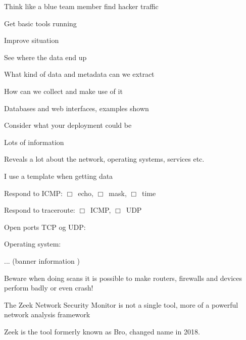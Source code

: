 \documentclass[Screen16to9,17pt]{foils}
\begin{document}
\begin{list1}
\item Think like a blue team member find hacker traffic
\item Get basic tools running
\item Improve situation
\begin{list2}
\item See where the data end up
\item What kind of data and metadata can we extract
\item How can we collect and make use of it
\item Databases and web interfaces, examples shown
\item Consider what your deployment could be
\end{list2}
\end{list1}





\begin{list1}
\item Lots of information
\item Reveals a lot about the network, operating systems, services etc.
\item I use a template when getting data
  \begin{list2}
    \item Respond to ICMP: $\Box$\  echo, $\Box$\ mask, $\Box$\ time
\item Respond to traceroute: $\Box$\ ICMP, $\Box$\ UDP
\item Open ports TCP og UDP:
\item Operating system:
\item ... (banner information )
  \end{list2}
\item Beware when doing scans it is possible to make routers, firewalls and devices perform badly or even crash!
\end{list1}




The Zeek Network Security Monitor is not a single tool, more of a
powerful network analysis framework

Zeek is the tool formerly known as Bro, changed name in 2018. 



\end{document}
